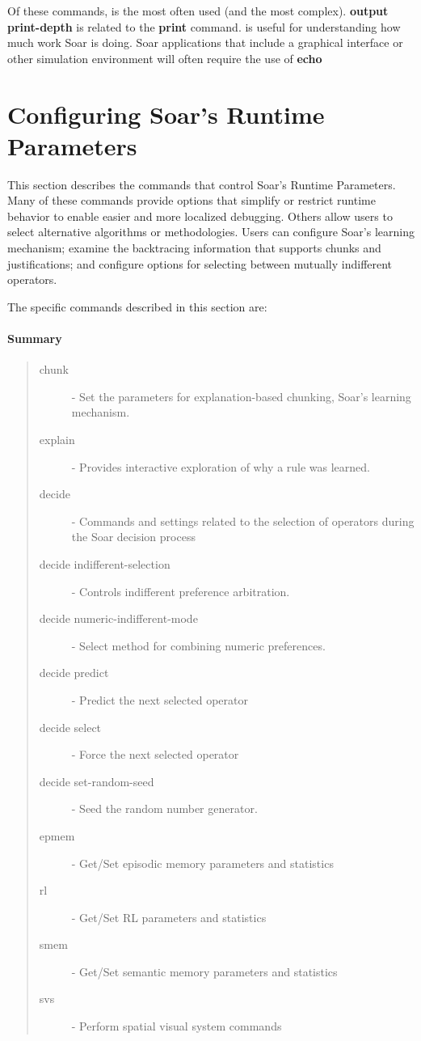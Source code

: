 Of these commands,  is the most often used (and the most 
complex).  \textbf{output print-depth} is related to the \textbf{print} command.  
is useful for understanding how much work Soar is doing. Soar applications that include a graphical interface or other
simulation environment will often require the use of \textbf{echo} 

\divider 

\divider 

\divider 

\divider 

\divider 

\divider 

\section{Configuring Soar's Runtime Parameters}
\label{RUNTIME}

This section describes the commands that control Soar's Runtime Parameters.
Many of these commands provide options that simplify or restrict 
runtime behavior to enable easier and more localized debugging.
Others allow users to select alternative algorithms or methodologies.
Users can configure Soar's learning mechanism; examine the
backtracing information that supports chunks and justifications;
and configure options for selecting between mutually indifferent operators.

The specific commands described in this section are:

\paragraph{Summary}
\begin{quote}
\begin{description}
\item[chunk] - Set the parameters for explanation-based chunking, Soar's learning mechanism.
\item[explain] - Provides interactive exploration of why a rule was learned.
\item[decide ] - Commands and settings related to the selection of operators during the Soar decision process
\item[decide indifferent-selection] -  Controls indifferent preference arbitration.
\item[decide numeric-indifferent-mode] - Select method for combining numeric preferences.
\item[decide predict] - Predict the next selected operator 
\item[decide select] - Force the next selected operator 
\item[decide set-random-seed] - Seed the random number generator.
\item[epmem] - Get/Set episodic memory parameters and statistics
\item[rl] - Get/Set RL parameters and statistics 
\item[smem] - Get/Set semantic memory parameters and statistics
\item[svs] - Perform spatial visual system commands
\end{description}
\end{quote}


